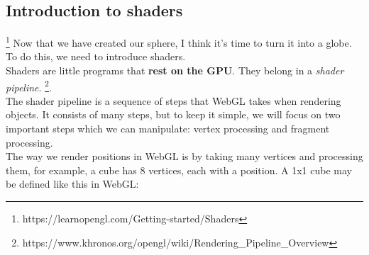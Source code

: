 \subsection{Introduction to shaders}\footnote{https://learnopengl.com/Getting-started/Shaders}
Now that we have created our sphere, I think it's time to turn it into a globe. To do this, we need to introduce shaders. \\
Shaders are little programs that \textbf{rest on the GPU}. They belong in a \textit{shader pipeline}.
\footnote{https://www.khronos.org/opengl/wiki/Rendering\_Pipeline\_Overview}. \\
The shader pipeline is a sequence of steps that WebGL takes when rendering objects. It consists of many steps, but to keep it simple, we will focus on two important steps which we can manipulate: vertex processing and fragment processing. \\
The way we render positions in WebGL is by taking many vertices and processing them, for example, a cube has 8 vertices, each with a position. A 1x1 cube may be defined like this in WebGL: \\
\begin{center}
\end{center}

